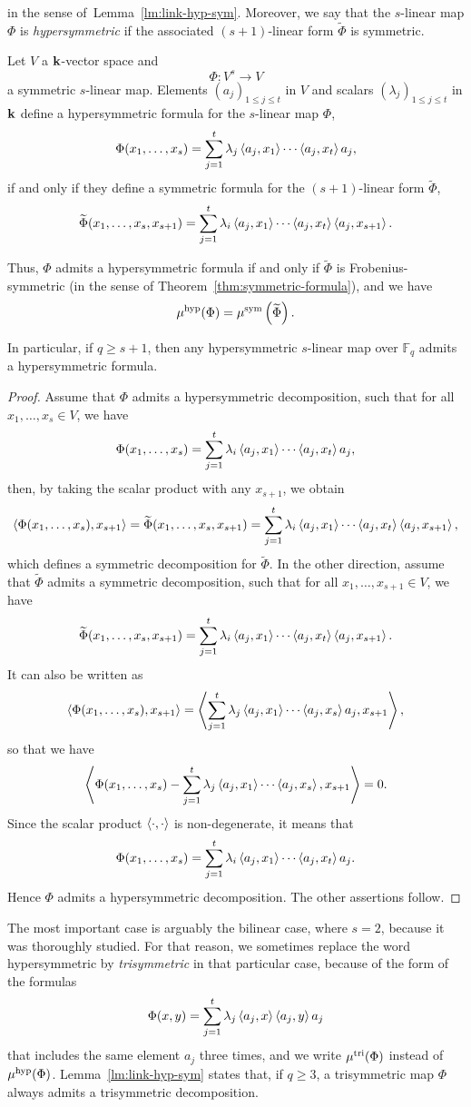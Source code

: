 in the sense of~Lemma~\ref{lm:link-hyp-sym}. Moreover, we say that the
$s$-linear map $\Phi$ is \emph{hypersymmetric} if the associated $(s+1)$-linear
form $\widetilde\Phi$ is symmetric.
\begin{lm}
  \label{lm:link-hyp-sym}
  Let $V$ a $\mathbf{k}$-vector space and 
  \[
    \Phi:V^s\to V
  \]
  a symmetric $s$-linear map. 
Elements $(a_j)_{1\leq j\leq t}$ in $V$ and scalars $(\lambda_j)_{1\leq j\leq t}$ in $\mathbf{k}$ define a hypersymmetric formula for the $s$-linear map $\Phi$,
\[
\Phi(x_1,\dots,x_s)=\sum_{j=1}^{t}\lambda_j\left\langle a_j,x_1\right\rangle\cdots\left\langle a_j,x_t\right\rangle a_j,
\]
if and only if they define a symmetric formula for the $(s+1)$-linear form $\widetilde{\Phi}$,
\[
\widetilde{\Phi}(x_1,\dots,x_s,x_{s+1})=\sum_{j=1}^{t}\lambda_i\left\langle a_j,x_1\right\rangle\cdots\left\langle a_j,x_t\right\rangle\left\langle a_j,x_{s+1}\right\rangle.
\]

Thus, $\Phi$ admits a hypersymmetric formula if and only if $\widetilde{\Phi}$ is Frobenius-symmetric (in the sense of Theorem~\ref{thm:symmetric-formula}),
and we have
\[
\mu^{\textrm{hyp}}(\Phi)=\mu^{\textrm{sym}}\left(\widetilde{\Phi}\right).
\]

In particular, if $q\geq s+1$, then any hypersymmetric $s$-linear map over $\mathbb{F}_q$ admits a hypersymmetric formula.
\end{lm}
\begin{proof}
  Assume that $\Phi$ admits a hypersymmetric decomposition, such that for all
  $x_1, \dots, x_s\in V$, we have
  \[
    \Phi(x_1,\dots,x_s)=\sum_{j=1}^{t}\lambda_i\left\langle a_j,x_1\right\rangle\cdots\left\langle a_j,x_t\right\rangle a_j,
  \]
  then, by taking the scalar product with any $x_{s+1}$, we obtain
\[
  \left\langle\Phi(x_1, \dots,
  x_s),x_{s+1}\right\rangle=\widetilde{\Phi}(x_1,\dots,x_s,x_{s+1})=\sum_{j=1}^{t}\lambda_i\left\langle a_j,x_1\right\rangle\cdots\left\langle a_j,x_t\right\rangle\left\langle a_j,x_{s+1}\right\rangle,
\]
which defines a symmetric decomposition for $\widetilde\Phi$. In the other
direction, assume that $\widetilde\Phi$ admits a symmetric decomposition, such
that for all $x_1, \dots, x_{s+1}\in V$, we have
\[
\widetilde{\Phi}(x_1,\dots,x_s,x_{s+1})=\sum_{j=1}^{t}\lambda_i\left\langle a_j,x_1\right\rangle\cdots\left\langle a_j,x_t\right\rangle\left\langle a_j,x_{s+1}\right\rangle.
\]
It can also be written as
\[
  \left\langle\Phi(x_1, \dots,
  x_s),x_{s+1}\right\rangle=\left\langle\sum_{j=1}^t\lambda_j\left\langle a_j,x_1\right\rangle\cdots\left\langle a_j,x_s\right\rangle a_j,x_{s+1}\right\rangle,
\]
so that we have
\[
  \left\langle\Phi(x_1, \dots,
  x_s)-\sum_{j=1}^t\lambda_j\left\langle a_j,x_1\right\rangle\cdots\left\langle a_j,x_s\right\rangle,x_{s+1}\right\rangle=0.
\]
Since the scalar product $\left\langle\cdot,\cdot\right\rangle$ is non-degenerate, it means that
  \[
    \Phi(x_1,\dots,x_s)=\sum_{j=1}^{t}\lambda_i\left\langle a_j,x_1\right\rangle\cdots\left\langle a_j,x_t\right\rangle a_j.
  \]
  Hence $\Phi$ admits a hypersymmetric decomposition. The other assertions
  follow.
\end{proof}
The most important case is arguably the bilinear case, where $s=2$, because it
was thoroughly studied. For that reason, we sometimes replace the word
hypersymmetric by \emph{trisymmetric} in that particular case, because of the
form of the formulas
\[
  \Phi(x, y) = \sum_{j=1}^t\lambda_j\left\langle a_j,x\right\rangle\left\langle a_j,y\right\rangle a_j
\]
that includes the same element $a_j$ three times, and we write $\mu^{\textrm{tri}}(\Phi)$
instead of $\mu^{\textrm{hyp}}(\Phi)$. Lemma~\ref{lm:link-hyp-sym} states that, if $q\geq3$, a
trisymmetric map $\Phi$ always admits a trisymmetric decomposition.

